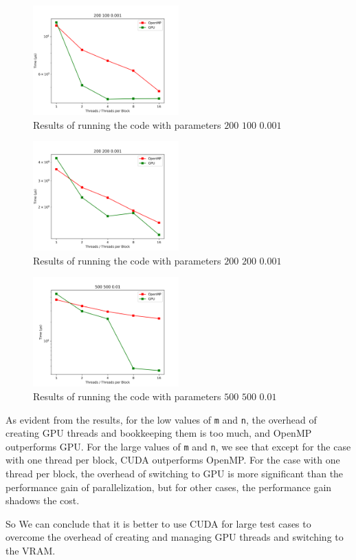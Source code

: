 \documentclass[12pt]{article}
\begin{document}
\begin{figure}[H]
	\centering
	\includegraphics[width=0.5\textwidth]{./images/Q5/2001000001.png}	
	\cprotect\caption{Results of running the code with parameters $200$ $100$ $0.001$}
	\label{fig:5-4}
\end{figure}

\begin{figure}[H]
	\centering
	\includegraphics[width=0.5\textwidth]{./images/Q5/2002000001.png}	
	\cprotect\caption{Results of running the code with parameters $200$ $200$ $0.001$}
	\label{fig:5-5}
\end{figure}

\begin{figure}[H]
	\centering
	\includegraphics[width=0.5\textwidth]{./images/Q5/500500001.png}	
	\cprotect\caption{Results of running the code with parameters $500$ $500$ $0.01$}
	\label{fig:5-6}
\end{figure}

As evident from the results, for the low values of \Verb+m+ and \Verb+n+, the overhead of creating GPU threads and bookkeeping them is too much, and OpenMP outperforms GPU. For the large values of \Verb+m+ and \Verb+n+, we see that except for the case with one thread per block, CUDA outperforms OpenMP. For the case with one thread per block, the overhead of switching to GPU is more significant than the performance gain of parallelization, but for other cases, the performance gain shadows the cost.

So We can conclude that it is better to use CUDA for large test cases to overcome the overhead of creating and managing GPU threads and switching to the VRAM. 



	
	
	
	
\end{document}

